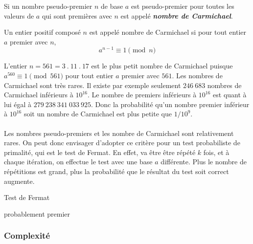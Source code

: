 \begin{itemize}
				Si un nombre pseudo-premier $n$ de base $a$ est pseudo-premier pour toutes les valeurs de $a$ qui sont premières avec $n$ est appelé \textit{\textbf{nombre de Carmichael}}. 
			
					\vspace{-1.5em}\begin{adjustwidth}{1.5cm}{1.5cm} 
					\begin{Def}
						\label{Carmich}
						Un entier positif composé $n$ est appelé nombre de Carmichael si pour tout entier $a$ premier avec $n$,
						\[a^{n-1}\equiv 1 \pmod n\]
					\end{Def}
					\end{adjustwidth}\vspace{0.5em}
					
				L'entier $n = 561 = 3\ .\ 11\ .\ 17$ est le plus petit nombre de Carmichael puisque $a^{560} \equiv 1 \pmod 561$ pour tout entier $a$ premier avec $561$. Les nombres de Carmichael sont très rares. Il existe par exemple seulement $246\ 683$ nombres de Carmichael inférieurs à $10^{16}$. Le nombre de premiers inférieurs à $10^{16}$ est quant à lui égal à $279\ 238\ 341\ 033\ 925$. Donc la probabilité qu'un nombre premier inférieur à $10^{16}$ soit un nombre de Carmichael est plus petite que $1/10^{9}$.
			
		\end{itemize}
		
		\paragraph{}Les nombres pseudo-premiers et les nombre de Carmichael sont relativement rares. On peut donc envisager d'adopter ce critère pour un test probabiliste de primalité, qui est le test de Fermat. En effet, va être être répété $k$ fois, et à chaque itération, on effectue le test avec une base $a$ différente. Plus le nombre de répétitions est grand, plus la probabilité que le résultat du test soit correct augmente.\\
		
		\begin{algorithm}[H]
			\caption{Test de Fermat}\label{TF}
		\Retour probablement premier\;
		\end{algorithm}
		
		
	\subsubsection{Complexité}
